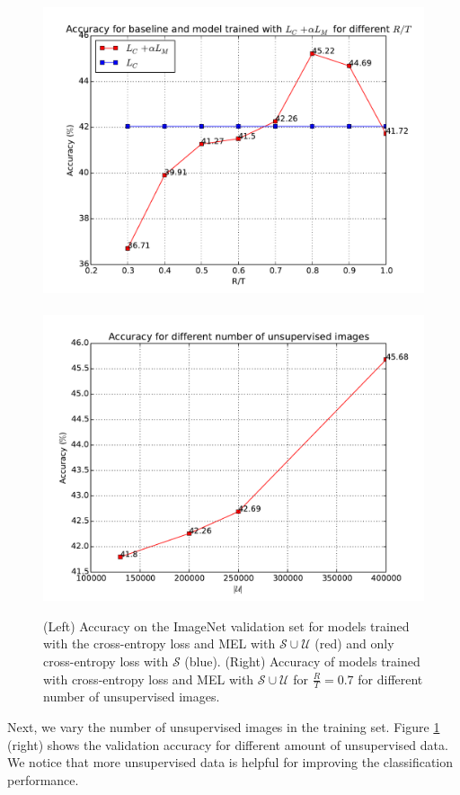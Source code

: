 \documentclass[runningheads]{llncs}
\begin{document}
\begin{figure}
	\centering
	{
		\includegraphics[scale=0.35]{accuracies.pdf}
	~
		\includegraphics[scale=0.35]{accuracies_unsup.pdf}
	}
		\caption{(Left) Accuracy on the ImageNet validation set for models trained with the cross-entropy
		loss and MEL with $\mathcal{S}\cup\mathcal{U}$ (red) and only cross-entropy loss with
	$\mathcal{S}$ (blue). (Right) Accuracy of models trained with cross-entropy loss and MEL with
$\mathcal{S}\cup\mathcal{U}$ for $\frac{R}{T} = 0.7$ for different number of unsupervised images.}
		\label{fig:acc}
\end{figure}

Next, we vary the number of unsupervised images in the training set. Figure \ref{fig:acc} (right)
shows the validation accuracy for different amount of unsupervised data. We notice that more
unsupervised data is helpful for improving the classification performance. 
\end{document}
